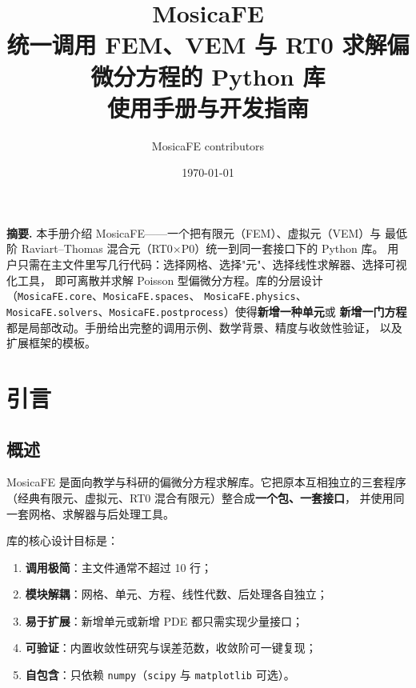 \documentclass[UTF8,11pt,oneside]{ctexbook}
\title{\Huge \textbf{MosicaFE}\\[0.4em]
       \Large 统一调用 FEM、VEM 与 RT0 求解偏微分方程的 Python 库\\[0.6em]
       \large 使用手册与开发指南}
\author{\normalsize MosicaFE contributors}
\date{\normalsize \today}
\theoremstyle{definition}
\theoremstyle{plain}
\newcommand{\mosica}{\textsf{MosicaFE}}
\newcommand{\code}[1]{\texttt{#1}}
\newcommand{\module}[1]{\texttt{MosicaFE.#1}}
\begin{document}
\frontmatter
\maketitle

\begin{center}
\begin{minipage}{0.86\textwidth}
\small
\textbf{摘要.} 本手册介绍 \mosica{}——一个把有限元（FEM）、虚拟元（VEM）与
最低阶 Raviart--Thomas 混合元（RT0$\times$P0）统一到同一套接口下的 Python 库。
用户只需在主文件里写几行代码：选择网格、选择"元"、选择线性求解器、选择可视化工具，
即可离散并求解 Poisson 型偏微分方程。库的分层设计（\module{core}、\module{spaces}、
\module{physics}、\module{solvers}、\module{postprocess}）使得\textbf{新增一种单元}或
\textbf{新增一门方程}都是局部改动。手册给出完整的调用示例、数学背景、精度与收敛性验证，
以及扩展框架的模板。
\end{minipage}
\end{center}

\vspace{1.0em}

\tableofcontents

\mainmatter

\chapter{引言}
\label{chap:intro}

\section{概述}

\mosica{} 是面向教学与科研的偏微分方程求解库。它把原本互相独立的三套程序
（经典有限元、虚拟元、RT0 混合有限元）整合成\textbf{一个包、一套接口}，
并使用同一套网格、求解器与后处理工具。

库的核心设计目标是：

\begin{enumerate}[label=(\arabic*),itemsep=0.25em]
  \item \textbf{调用极简}：主文件通常不超过 10 行；
  \item \textbf{模块解耦}：网格、单元、方程、线性代数、后处理各自独立；
  \item \textbf{易于扩展}：新增单元或新增 PDE 都只需实现少量接口；
  \item \textbf{可验证}：内置收敛性研究与误差范数，收敛阶可一键复现；
  \item \textbf{自包含}：只依赖 \code{numpy}（\code{scipy} 与 \code{matplotlib} 可选）。
\end{enumerate}
\end{document}
